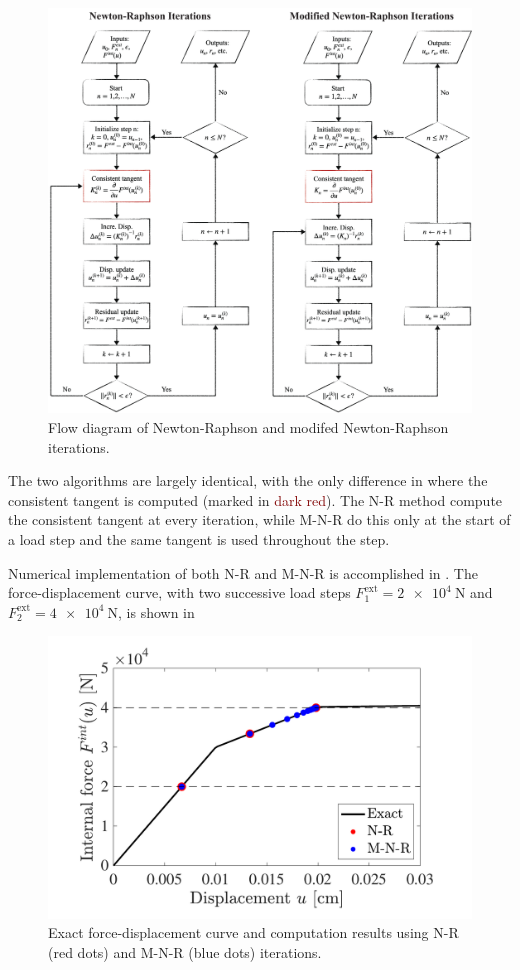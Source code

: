 \begin{figure}[!ht]
    \centering
    \includegraphics[width=\linewidth]{homework/hw1/hw1_flow_chart.pdf}
    \caption{Flow diagram of Newton-Raphson and modifed Newton-Raphson iterations. }
    \label{fig:hw1_flow_chart}
\end{figure}

The two algorithms are largely identical, with the only difference in where the consistent tangent is computed (marked in \textcolor{Maroon}{dark red}).
The N-R method compute the consistent tangent at every iteration, while M-N-R do this only at the start of a load step and the same tangent is used throughout the step. 

Numerical implementation of both N-R and M-N-R is accomplished in \matlab. 
The force-displacement curve, with two successive load steps $F^{\textrm{ext}}_1 = \qty{2e+4}{\newton}$ and $F^{\textrm{ext}}_2 = \qty{4e+4}{\newton}$, is shown in 

\begin{figure}[!ht]
    \centering
    \includegraphics[width=0.6\linewidth]{homework/hw1/hw1_p3.pdf}
    \caption{Exact force-displacement curve and computation results using N-R (red dots) and M-N-R (blue dots) iterations.}
    \label{fig:hw1_p3_fd}
\end{figure}
